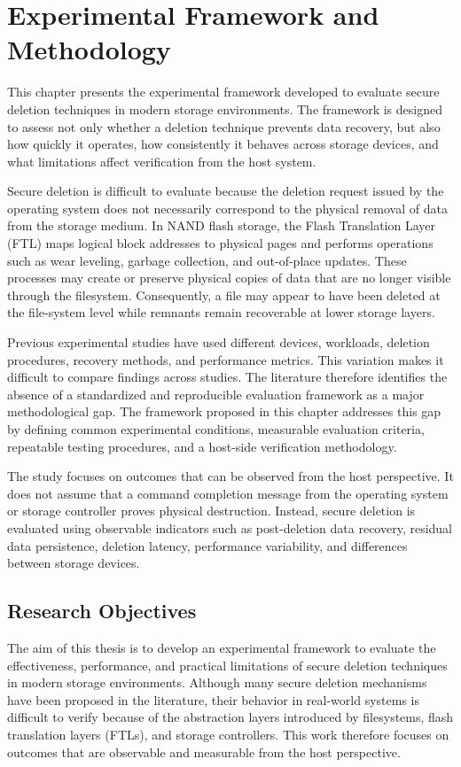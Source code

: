 \chapter{Experimental Framework and Methodology}
\label{sec:experimental-framework}

This chapter presents the experimental framework developed to evaluate secure deletion techniques in modern storage environments. The 
framework is designed to assess not only whether a deletion technique prevents data recovery, but also how quickly it operates, how 
consistently it behaves across storage devices, and what limitations affect verification from the host system.

Secure deletion is difficult to evaluate because the deletion request issued by the operating system does not necessarily correspond 
to the physical removal of data from the storage medium. In NAND flash storage, the Flash Translation Layer (FTL) maps logical block 
addresses to physical pages and performs operations such as wear leveling, garbage collection, and out-of-place updates. These 
processes may create or preserve physical copies of data that are no longer visible through the filesystem. Consequently, a file may 
appear to have been deleted at the file-system level while remnants remain recoverable at lower storage layers.

Previous experimental studies have used different devices, workloads, deletion procedures, recovery methods, and performance metrics. 
This variation makes it difficult to compare findings across studies. The literature therefore identifies the absence of a 
standardized and reproducible evaluation framework as a major methodological gap. The framework proposed in this chapter addresses 
this gap by defining common experimental conditions, measurable evaluation criteria, repeatable testing procedures, and a host-side 
verification methodology.

The study focuses on outcomes that can be observed from the host perspective. It does not assume that a command completion message 
from the operating system or storage controller proves physical destruction. Instead, secure deletion is evaluated using observable 
indicators such as post-deletion data recovery, residual data persistence, deletion latency, performance variability, and differences 
between storage devices.

\section{Research Objectives}
The aim of this thesis is to develop an experimental framework to evaluate the effectiveness, performance, and practical limitations of 
secure deletion techniques in modern storage environments. Although many secure deletion mechanisms have been proposed in the literature, 
their behavior in real-world systems is difficult to verify because of the abstraction layers introduced by filesystems, flash 
translation layers (FTLs), and storage controllers. This work therefore focuses on outcomes that are observable and measurable from the 
host perspective.

